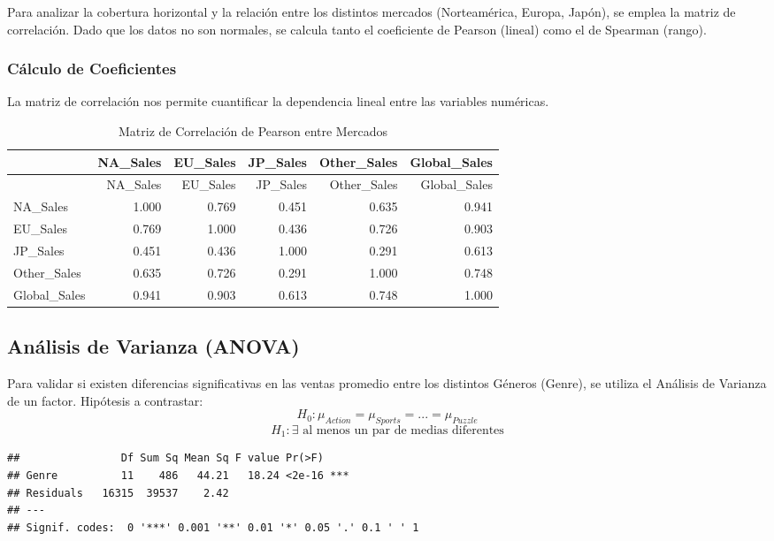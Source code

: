 \documentclass[oneside,11pt]{Latex/Classes/PhDthesisPSnPDF}
\begin{document}
Para analizar la cobertura horizontal y la relación entre los distintos
mercados (Norteamérica, Europa, Japón), se emplea la matriz de
correlación. Dado que los datos no son normales, se calcula tanto el
coeficiente de Pearson (lineal) como el de Spearman (rango).

\subsubsection{Cálculo de Coeficientes}

La matriz de correlación nos permite cuantificar la dependencia lineal
entre las variables numéricas.

\begin{longtable}[]{@{}lrrrrr@{}}
\caption{Matriz de Correlación de Pearson entre Mercados}\tabularnewline
\toprule\noalign{}
& NA\_Sales & EU\_Sales & JP\_Sales & Other\_Sales & Global\_Sales \\
\midrule\noalign{}
\endfirsthead
\toprule\noalign{}
& NA\_Sales & EU\_Sales & JP\_Sales & Other\_Sales & Global\_Sales \\
\midrule\noalign{}
\endhead
\bottomrule\noalign{}
\endlastfoot
NA\_Sales & 1.000 & 0.769 & 0.451 & 0.635 & 0.941 \\
EU\_Sales & 0.769 & 1.000 & 0.436 & 0.726 & 0.903 \\
JP\_Sales & 0.451 & 0.436 & 1.000 & 0.291 & 0.613 \\
Other\_Sales & 0.635 & 0.726 & 0.291 & 1.000 & 0.748 \\
Global\_Sales & 0.941 & 0.903 & 0.613 & 0.748 & 1.000 \\
\end{longtable}

\subsection{Análisis de Varianza (ANOVA)}

Para validar si existen diferencias significativas en las ventas
promedio entre los distintos Géneros (Genre), se utiliza el Análisis de
Varianza de un factor. Hipótesis a contrastar:
\[ H_0: \mu_{Action} = \mu_{Sports} = ... = \mu_{Puzzle} \]
\[ H_1: \exists \text{ al menos un par de medias diferentes} \]

\begin{verbatim}
##                Df Sum Sq Mean Sq F value Pr(>F)    
## Genre          11    486   44.21   18.24 <2e-16 ***
## Residuals   16315  39537    2.42                   
## ---
## Signif. codes:  0 '***' 0.001 '**' 0.01 '*' 0.05 '.' 0.1 ' ' 1
\end{verbatim}
\end{document}
